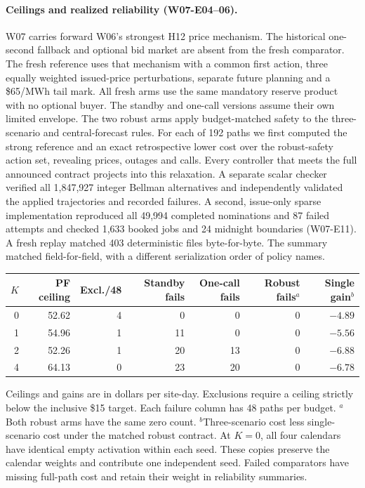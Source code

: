 \documentclass[11pt,letterpaper]{article}
\begin{document}
\paragraph{Ceilings and realized reliability (W07-E04--06).}
W07 carries forward W06's strongest H12 price mechanism. The historical one-second fallback and optional bid market are absent from the fresh comparator. The fresh reference uses that mechanism with a common first action, three equally weighted issued-price perturbations, separate future planning and a \$65/MWh tail mark. All fresh arms use the same mandatory reserve product with no optional buyer. The standby and one-call versions assume their own limited envelope. The two robust arms apply budget-matched safety to the three-scenario and central-forecast rules. For each of 192 paths we first computed the strong reference and an exact retrospective lower cost over the robust-safety action set, revealing prices, outages and calls. Every controller that meets the full announced contract projects into this relaxation. A separate scalar checker verified all 1,847,927 integer Bellman alternatives and independently validated the applied trajectories and recorded failures. A second, issue-only sparse implementation reproduced all 49,994 completed nominations and 87 failed attempts and checked 1,633 booked jobs and 24 midnight boundaries (W07-E11). A fresh replay matched 403 deterministic files byte-for-byte. The summary matched field-for-field, with a different serialization order of policy names.

\begin{center}\small
\begin{tabular}{rrrrrrr}
\hline
$K$ & PF ceiling & Excl./48 & Standby fails & One-call fails & Robust fails$^{a}$ & Single gain$^{b}$\\
\hline
0 & 52.62 & 4 & 0 & 0 & 0 & $-4.89$\\
1 & 54.96 & 1 & 11 & 0 & 0 & $-5.56$\\
2 & 52.26 & 1 & 20 & 13 & 0 & $-6.88$\\
4 & 64.13 & 0 & 23 & 20 & 0 & $-6.78$\\
\hline
\end{tabular}
\end{center}
Ceilings and gains are in dollars per site-day. Exclusions require a ceiling strictly below the inclusive \$15 target. Each failure column has 48 paths per budget. $^a$Both robust arms have the same zero count. $^b$Three-scenario cost less single-scenario cost under the matched robust contract. At $K=0$, all four calendars have identical empty activation within each seed. These copies preserve the calendar weights and contribute one independent seed. Failed comparators have missing full-path cost and retain their weight in reliability summaries.
\end{document}
